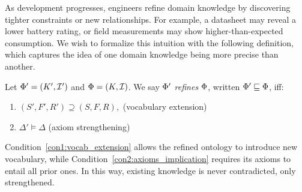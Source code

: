 As development progresses, engineers refine domain knowledge by discovering tighter constraints or new relationships. For example, a datasheet may reveal a lower battery rating, or field measurements may show higher-than-expected consumption. We wish to formalize this intuition with the following definition, which captures the idea of one domain knowledge being more precise than another. 




%
\begin{definition}
      Let $\Phi' = (K', \mathcal{I}')$ and $\Phi = (K, \mathcal{I})$. %
 We say $\Phi'$ \emph{refines} 
$\Phi$, written $\Phi' 
\sqsubseteq \Phi$, iff:
\begin{enumerate}[label=\Roman*), ref=\Roman*]
  \item \label{con1:vocab_extension}$(S', F', R') \supseteq (S, F, R), $ \hfill (vocabulary extension)
  \item \label{con2:axioms_implication} $\Delta' \models \Delta$ \hfill (axiom strengthening)
\end{enumerate}
%      
\end{definition}

Condition~\ref{con1:vocab_extension} allows the refined ontology to introduce new vocabulary, while Condition~\ref{con2:axioms_implication} requires its axioms to entail all prior ones. In this way, existing knowledge is never contradicted, only strengthened. %

